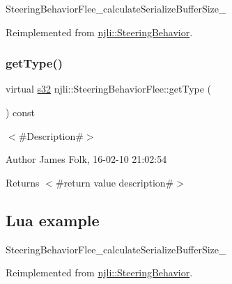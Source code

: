 \begin{DoxyCodeInclude}
\end{DoxyCodeInclude}
Steering\+Behavior\+Flee\+\_\+calculate\+Serialize\+Buffer\+Size\+\_\+ 

Reimplemented from \mbox{\hyperlink{classnjli_1_1_steering_behavior_abb58d6982dc295fc3e90f096f51b0ef8}{njli\+::\+Steering\+Behavior}}.

\mbox{\label{classnjli_1_1_steering_behavior_flee_ac7e1def63e331a0ea6d59f75bfc39d22}} 
\subsubsection{\texorpdfstring{get\+Type()}{getType()}}
{\footnotesize\ttfamily virtual \mbox{\hyperlink{_util_8h_aa62c75d314a0d1f37f79c4b73b2292e2}{s32}} njli\+::\+Steering\+Behavior\+Flee\+::get\+Type (\begin{DoxyParamCaption}{ }\end{DoxyParamCaption}) const\hspace{0.3cm}{\ttfamily [virtual]}}



$<$\#\+Description\#$>$ 

\begin{DoxyAuthor}{Author}
James Folk, 16-\/02-\/10 21\+:02\+:54
\end{DoxyAuthor}
\begin{DoxyReturn}{Returns}
$<$\#return value description\#$>$
\end{DoxyReturn}
\hypertarget{classnjli_1_1_steering_behavior_wander_ex1}{}\subsection{Lua example}\label{classnjli_1_1_steering_behavior_wander_ex1}

\begin{DoxyCodeInclude}
\end{DoxyCodeInclude}
Steering\+Behavior\+Flee\+\_\+calculate\+Serialize\+Buffer\+Size\+\_\+ 

Reimplemented from \mbox{\hyperlink{classnjli_1_1_steering_behavior_ae82bca8468d41aff8c22b76fd359fe9b}{njli\+::\+Steering\+Behavior}}.

\mbox{\label{classnjli_1_1_steering_behavior_flee_a40035596d46b8133b30866e34a1e0395}} 
